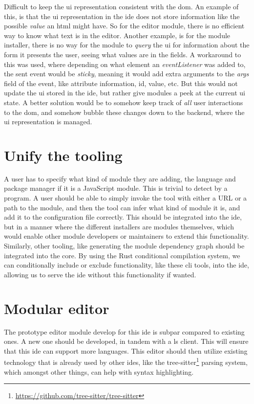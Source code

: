 Difficult to keep the \gls*{ui} representation consistent with the \gls*{dom}.
An example of this, is that the \gls*{ui} representation in the \gls*{ide} does
not store information like the possible \textit{value} an \gls{html} might
have. So for the editor module, there is no efficient way to know what text is
in the editor. Another example, is for the module installer, there is no way for
the module to \textit{query} the \gls*{ui} for information about the form it
presents the user, seeing what values are in the fields. A workaround to this
was used, where depending on what element an \textit{eventListener} was added
to, the sent event would be \textit{sticky}, meaning it would add extra
arguments to the \textit{args} field of the event, like attribute information,
id, value, etc. But this would not update the \gls*{ui} stored in the
\gls*{ide}, but rather give modules a peek at the current \gls*{ui} state. A
better solution would be to somehow keep track of \textit{all} user interactions
to the \gls*{dom}, and somehow bubble these changes down to the backend, where
the \gls*{ui} representation is managed.


\section{Unify the tooling}

A user has to specify what kind of module they are adding, the language and
package manager if it is a JavaScript module. This is trivial to detect by a
program. A user should be able to simply invoke the tool with either a URL or a
path to the module, and then the tool can infer what kind of module it is, and
add it to the configuration file correctly. This should be integrated into the
\gls*{ide}, but in a manner where the different installers are modules
themselves, which would enable other module developers or maintainers to
extend this functionality. Similarly, other tooling, like generating the module
dependency graph should be integrated into the core. By using the Rust
conditional compilation system, we can conditionally include or exclude
functionality, like these \gls*{cli} tools, into the \gls*{ide}, allowing us to
serve the \gls*{ide} without this functionality if wanted.


\section{Modular editor}

The prototype editor module develop for this \gls*{ide} is subpar compared to
existing ones. A new one should be developed, in tandem with a \gls*{ls} client.
This will ensure that this \gls*{ide} can support more languages. This editor
should then utilize existing technology that is already used by other
\gls*{ide}s, like the tree-sitter\footnote{\url{https://github.com/tree-sitter/tree-sitter}}
parsing system, which amongst other things, can help with syntax highlighting.

